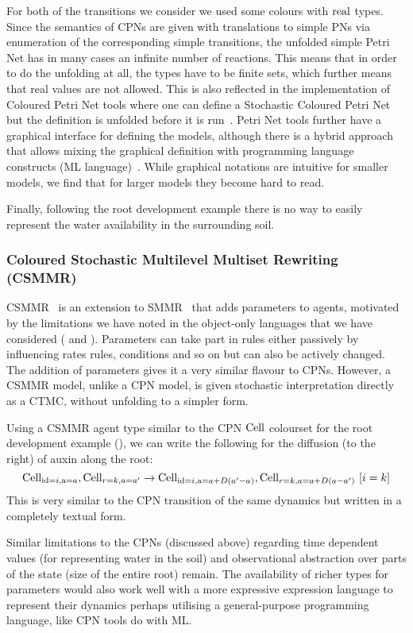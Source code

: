 For both of the transitions we consider we used some colours with $\mathrm{real}$
types. Since the semantics of CPNs are given with translations to simple PNs via
enumeration of the corresponding simple transitions, the unfolded simple Petri
Net has in many cases an infinite number of reactions. This means that in order
to do the unfolding at all, the types have to be finite sets, which further
means that real values are not allowed. This is also reflected in the
implementation of Coloured Petri Net tools where one can define a Stochastic
Coloured Petri Net but the definition is unfolded before it is
run~\citep{heiner_snoopyunifying_2012}. Petri Net tools further have a graphical
interface for defining the models, although there is a hybrid approach that
allows mixing the graphical definition with programming language constructs (ML
language)~\cite{jensen_coloured_1987}. While graphical notations are intuitive
for smaller models, we find that for larger models they become hard to read.

Finally, following the root development example there is no way to easily
represent the water availability in the surrounding soil.

\subsubsection*{Coloured Stochastic Multilevel Multiset Rewriting (CSMMR)}
CSMMR~\citep{oury_coloured_2011} is an extension to
SMMR~\citep{oury_multi-level_2013} that adds parameters to agents, motivated by
the limitations we have noted in the object-only languages that we have
considered ( and ). Parameters can take
part in rules either passively by influencing rates rules, conditions and so on
but can also be actively changed. The addition of parameters gives it a very
similar flavour to CPNs. However, a CSMMR model, unlike a CPN model, is given
stochastic interpretation directly as a CTMC, without unfolding to a simpler
form.

Using a CSMMR agent type similar to the CPN $\mathrm{Cell}$ colourset for the root
development example (), we can write the following
for the diffusion (to the right) of auxin along the root:
$$
\mathrm{Cell}_{\mathrm{id}=i, \mathrm{a}=a}, \mathrm{Cell}_{r=k, a=a'} \xrightarrow{}
\mathrm{Cell}_{\mathrm{id}=i, \mathrm{a}=a+D(a'-a)}, \mathrm{Cell}_{r=k, a=a+D(a-a')} \, \,
[i=k]
$$
This is very similar to the CPN transition of the same dynamics but written in a
completely textual form.

Similar limitations to the CPNs (discussed above) regarding time dependent
values (\eg for representing water in the soil) and observational abstraction
over parts of the state (\eg size of the entire root) remain. The availability
of richer types for parameters would also work well with a more expressive
expression language to represent their dynamics perhaps utilising a
general-purpose programming language, like CPN tools do with ML.

